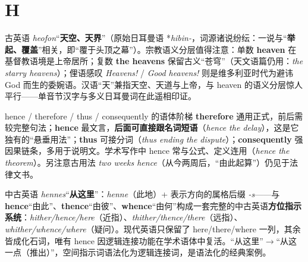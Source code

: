 \documentclass[../main.tex]{subfiles}
\begin{document}
\section{H}



\begin{origin}
古英语 \textit{heofon}“\textbf{天空、天界}”（原始日耳曼语 *\textit{hibin-}，词源诸说纷纭：一说与“\textbf{举起、覆盖}”相关，即“覆于头顶之幕”）。宗教语义分层值得注意：单数 \textbf{heaven} 在基督教语境是上帝居所；复数 \textbf{the heavens} 保留古义“苍穹”（天文语篇仍用：\textit{the starry heavens}）；俚语感叹 \textit{Heavens!} / \textit{Good heavens!} 则是维多利亚时代为避讳 God 而生的委婉语。汉语“天”兼指天空、天道与上帝，与 heaven 的语义分层惊人平行——单音节汉字与多义日耳曼词在此遥相印证。
\end{origin}



\begin{gram}{hence / therefore / thus / consequently 的语体阶梯}
\textbf{therefore} 通用正式，前后需较完整句法；\textbf{hence} 最文言，\textbf{后面可直接跟名词短语}（\textit{hence the delay}），这是它独有的“悬垂用法”；\textbf{thus} 可接分词（\textit{thus ending the dispute}）；\textbf{consequently} 强因果链条，多用于说明文。学术写作中 hence 常与公式、定义连用（\textit{hence the theorem}）。另注意古用法 \textit{two weeks hence}（从今两周后，“由此起算”）仍见于法律文书。
\end{gram}

\begin{origin}
中古英语 \textit{hennes}“\textbf{从这里}”：\textit{henne}（此地）+ 表示方向的属格后缀 \textit{-s}——与 \textbf{hence}“由此”、\textbf{thence}“由彼”、\textbf{whence}“由何”构成一套完整的中古英语\textbf{方位指示系统}：\textit{hither/hence/here}（近指）、\textit{thither/thence/there}（远指）、\textit{whither/whence/where}（疑问）。现代英语只保留了 here/there/where 一列，其余皆成化石词，唯有 hence 因逻辑连接功能在学术语体中复活。“从这里”$\to$“从这一点（推出）”，空间指示词语法化为逻辑连接词，是语法化的经典案例。
\end{origin}
\end{document}
